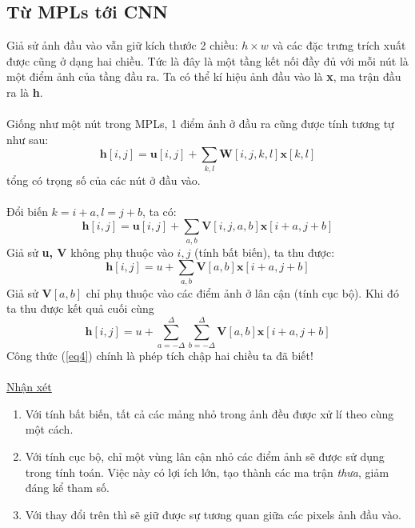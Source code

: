 \documentclass{article}
\begin{document}
\subsection{Từ MPLs tới CNN}
Giả sử ảnh đầu vào vẫn giữ kích thước 2 chiều: $h\times w$ và các đặc trưng trích xuất được cũng ở dạng hai chiều. Tức là đây là một tầng kết nối đầy đủ với mỗi nút là một điểm ảnh của tầng đầu ra. Ta có thể kí hiệu ảnh đầu vào là \textbf{x}, ma trận đầu ra là \textbf{h}.\\\\
Giống như một nút trong MPLs, 1 điểm ảnh ở đầu ra cũng được tính tương tự như sau:
\begin{equation}
    \textbf{h}[i,j] = \textbf{u}[i,j]+\sum_{k,l}\textbf{W}[i,j,k,l]\textbf{x}[k,l]
    \label{eq1}
\end{equation}
tổng có trọng số của các nút ở đầu vào.\\\\
Đổi biến $k = i+a, l = j+b$, ta có:
\begin{equation}
    \textbf{h}[i,j] = \textbf{u}[i,j]+\sum_{a,b}\textbf{V}[i,j,a,b]\textbf{x}[i+a,j+b]
    \label{eq2}
\end{equation}
Giả sử \textbf{u, V} không phụ thuộc vào $i,j$ (tính bất biến), ta thu được:
\begin{equation}
    \textbf{h}[i,j] = u+\sum_{a,b}\textbf{V}[a,b]\textbf{x}[i+a,j+b]
    \label{eq3}
\end{equation}
Giả sử $\textbf{V}[a,b]$ chỉ phụ thuộc vào các điểm ảnh ở lân cận (tính cục bộ). Khi đó ta thu được kết quả cuối cùng
\begin{equation}
        \textbf{h}[i,j] = u+\sum_{a=-\Delta}^{\Delta}\sum_{b = -\Delta}^{\Delta}\textbf{V}[a,b]\textbf{x}[i+a,j+b]
    \label{eq4}
\end{equation}
Công thức (\ref{eq4}) chính là phép tích chập hai chiều ta đã biết!\\\\
\underline{Nhận xét}
\begin{enumerate}
    \item Với tính bất biến, tất cả các mảng nhỏ trong ảnh đều được xử lí theo cùng một cách.
    \item Với tính cục bộ, chỉ một vùng lân cận nhỏ các điểm ảnh sẽ được sử dụng trong tính toán. Việc này có lợi ích lớn, tạo thành các ma trận \textit{thưa}, giảm đáng kể tham số.
    \item Với thay đổi trên thì sẽ giữ được sự tương quan giữa các pixels ảnh đầu vào.
\end{enumerate}
\end{document}
